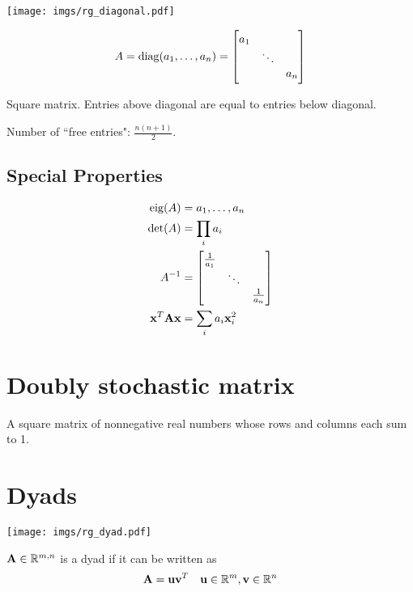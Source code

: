 \begin{center}
\texttt{[image: imgs/rg\_diagonal.pdf]}
\end{center}

\begin{equation}
A=\operatorname{diag}(a_1,\ldots,a_n)=
\begin{bmatrix}
a_1  &        &  \\
     & \ddots &  \\
     &        & a_n
\end{bmatrix}
\end{equation}

Square matrix. Entries above diagonal are equal to entries below diagonal.

Number of ``free entries": $\frac{n(n+1)}{2}$.

\subsection*{Special Properties}

\begin{align}
\operatorname{eig}(A) &= {a_1,\ldots,a_n}           \\
\det(A) &= \prod_i a_i                \\
A^{-1}  &=
\begin{bmatrix}
\frac{1}{a_1} &        &               \\
              & \ddots &               \\
              &        & \frac{1}{a_n}
\end{bmatrix} \\
\mathbf{x}^T \mathbf{A} \mathbf{x} &= \sum_i a_i \mathbf{x}_i^2
\end{align}

\section{Doubly stochastic matrix}
A square matrix of nonnegative real numbers whose rows and columns each sum to 1.


\section{Dyads}

\begin{center}
\texttt{[image: imgs/rg\_dyad.pdf]}
\end{center}

$\mathbf{A}\in\mathbb{R}^{m,n}$ is a dyad if it can be written as
\begin{equation}
\mathbf{A}=\mathbf{u}\mathbf{v}^T~~~\mathbf{u}\in\mathbb{R}^{m}, \mathbf{v}\in\mathbb{R}^{n}
\end{equation}

